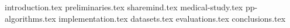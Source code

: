 \documentclass[inscr,ack,dvipsnames]{dithesis}
\begin{document}

\frontmatter

\mainmatter


{introduction.tex}
{preliminaries.tex}
{sharemind.tex}
{medical-study.tex}
{pp-algorithms.tex}
{implementation.tex}
{datasets.tex}
{evaluations.tex}
{conclusions.tex}


\backmatter
\end{document}
